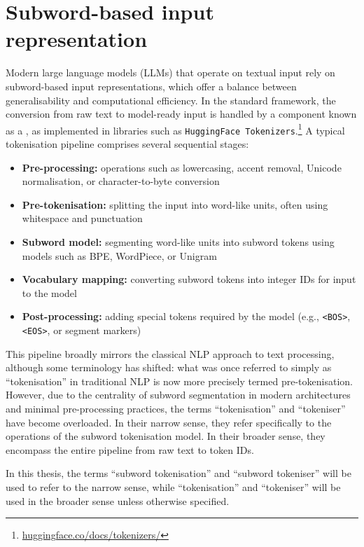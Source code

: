 \section{Subword-based input representation}\label{sec:12-subword}

Modern large language models (LLMs) that operate on textual input rely on subword-based input representations, which offer a balance between generalisability and computational efficiency. In the standard framework, the conversion from raw text to model-ready input is handled by a component known as a , as implemented in libraries such as \texttt{HuggingFace Tokenizers}.\footnote{\href{https://huggingface.co/docs/tokenizers/index}{huggingface.co/docs/tokenizers/}} A typical tokenisation pipeline comprises several sequential stages:

\begin{itemize}
\item \textbf{Pre-processing:} operations such as lowercasing, accent removal, Unicode normalisation, or character-to-byte conversion
\item \textbf{Pre-tokenisation:} splitting the input into word-like units, often using whitespace and punctuation
\item \textbf{Subword model:} segmenting word-like units into subword tokens using models such as BPE, WordPiece, or Unigram
\item \textbf{Vocabulary mapping:} converting subword tokens into integer IDs for input to the model
\item \textbf{Post-processing:} adding special tokens required by the model (e.g., \texttt{<BOS>}, \texttt{<EOS>}, or segment markers)
\end{itemize}

This pipeline broadly mirrors the classical NLP approach to text processing, although some terminology has shifted: what was once referred to simply as “tokenisation” in traditional NLP is now more precisely termed pre-tokenisation. However, due to the centrality of subword segmentation in modern architectures and minimal pre-processing practices, the terms “tokenisation” and “tokeniser” have become overloaded. In their narrow sense, they refer specifically to the operations of the subword tokenisation model. In their broader sense, they encompass the entire pipeline from raw text to token IDs.

In this thesis, the terms “subword tokenisation” and “subword tokeniser” will be used to refer to the narrow sense, while “tokenisation” and “tokeniser” will be used in the broader sense unless otherwise specified.

